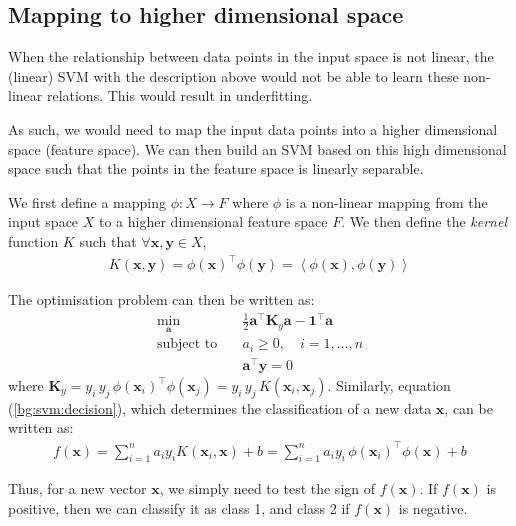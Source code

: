 \documentclass[12pt, twoside, a4paper]{report}
\def\vec{\boldsymbol}
\begin{document}
\subsection{Mapping to higher dimensional space}
When the relationship between data points in the input space is not linear, the (linear) SVM with the description above would not be able to learn these non-linear relations. This would result in underfitting.

As such, we would need to map the input data points into a higher dimensional space (feature space). We can then build an SVM based on this high dimensional space such that the points in the feature space is linearly separable.

We first define a mapping $\phi : X \rightarrow F$ where $\phi$ is a non-linear mapping from the input space $X$ to a higher dimensional feature space $F$. We then define the \textit{kernel} function $K$ such that $\forall \vec x, \vec y \in X$,
\begin{align*}
K(\vec x, \vec y) = \phi(\vec x)^\top \phi(\vec{y}) = \left\langle \phi(\vec x) , \phi(\vec{y}) \right\rangle
\end{align*}

The optimisation problem can then be written as:
\begin{align*}
\min_{\vec a} \quad &\frac{1}{2} \vec{a}^\top \vec{K}_y \vec{a} - \vec{1}^\top \vec a \\
\text{subject to} \quad &a_i \geq 0, \quad i = 1, \dots , n \\
&\vec{a}^\top \vec y = 0
\end{align*}
where $\vec{K}_y = y_i \, y_j \, \phi(\vec{x}_i)^\top \phi(\vec{x}_j) = y_i \, y_j \, K(\vec{x}_i, \vec{x}_j)$. Similarly, equation (\ref{bg:svm:decision}), which determines the classification of a new data $\vec{x}$, can be written as:
\begin{align*}
f(\vec{x}) = \sum_{i=1}^n a_i y_i K(\vec{x}_i, \vec{x}) + b = \sum_{i=1}^n a_i y_i \, \phi(\vec{x}_i)^\top \phi(\vec{x}) + b
\end{align*}

Thus, for a new vector $\vec{x}$, we simply need to test the sign of $f(\vec{x})$. If $f(\vec{x})$ is positive, then we can classify it as class 1, and class 2 if $f(\vec{x})$ is negative.
\end{document}
